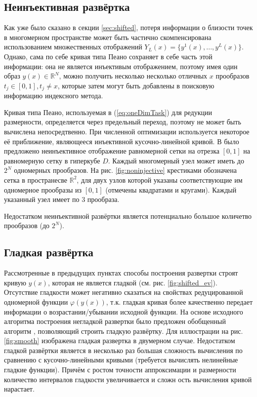 \subsection{Неинъективная развёртка}

Как уже было сказано в секции \ref{sec:shifted}, потеря информации о близости точек в многомерном
пространстве может быть частично скомпенсирована использованием множественных отображений $Y_L(x)=\{y^1(x),...,y^L(x)\}$.
Однако, сама по себе кривая типа Пеано сохраняет в себе часть этой информации: она не является инъективым отображением,
поэтому имея один образ $y(x)\in \mathbb{R}^N$, можно получить несколько несколько отличных $x$ прообразов $t_j\in[0,1], t_j \not = x$,
которые затем могут быть добавлены в поисковую информацию индексного метода.

Кривая типа Пеано, используемая в (\ref{eq:oneDimTask}) для редукции размерности, определяется через предельный переход,
поэтому не может быть вычислена непосредтвенно. При численной оптимизации используется некоторое её приближение, являющееся
инъективной кусочно-линейной кривой. В \cite{strongin1978} было предложено неинъективное отображение равномерной сетки на
отрезка $[0,1]$ на равномерную сетку в гиперкубе $D$. Каждый многомерный узел может иметь до $2^N$ одномерных прообразов.
На рис. \ref{fig:noninjective} крестиками обозначена сетка в пространесве $\mathbb{R}^2$, для двух узлов которой
указаны соответствующие им одномерное прообразы из $[0,1]$ (отмечены квадратами и кругами). Каждый указанный узел имеет по 3 прообраза.

Недостатком неинъективной развёртки является потенциально большое количетво прообразов (до $2^N$).


\subsection{Гладкая развёртка}

Рассмотренные в предыдущих пунктах способы построения развертки строят кривую $y(x)$, которая не является
гладкой (см. рис. \ref{fig:shifted_ev}). Отсутствие гладкости может негативно сказаться на свойствах редуцированной
одномерной функции $\varphi(y(x))$, т.к. гладкая кривая более качественно передает информации о возрастании/убывании
исходной функции. На основе исходного алгоритма построения негладкой развертки было предложен обобщенный алгоритм
\cite{Goryachih2017}, позволяющий строить гладкую развёртку. Для иллюстрации на рис. \ref{fig:smooth} изображена гладкая
развертка в двумерном случае. Недостатком гладкой развёртки является в несколько раз большая сложность вычисления по
сравнению с кусочно-линейными кривыми (требуется вычислять нелинейные гладкие функции). Причём с ростом точности аппроксимации и
размерности количество интервалов гладкости увеличивается и сложн ость вычисления кривой нарастает.

